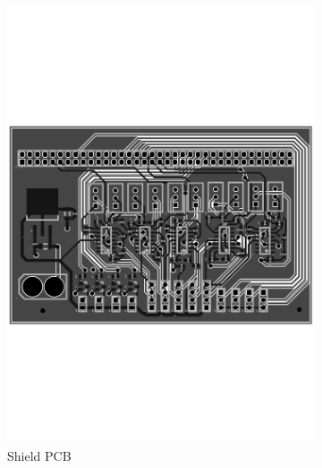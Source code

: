 \documentclass[11pt,a4paper]{article}
\begin{document}
\begin{figure}[hbt!]
    \centering
    \centering
    \begin{subfigure}[t]{0.45\textwidth}
        \centering
        \includegraphics[angle=270, origin=c, clip, trim=0cm 8cm 0cm 8cm, width=1.00\textwidth]{ShieldPCB.pdf}
        \caption{Shield PCB}
        \label{fig:shield_PCB}
    \end{subfigure}
    \begin{subfigure}[t]{0.45\textwidth}
        \centering

\end{subfigure}
\end{figure}
\end{document}
